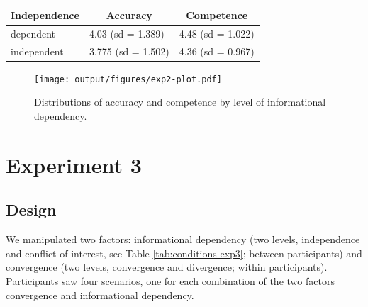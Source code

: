 \documentclass[
  doc,floatsintext]{apa6}
\begin{document}
\begin{table}[tbp]

\begin{center}
\begin{threeparttable}

\caption{\label{tab:exp2-table}}

\begin{tabular}{lll}
\toprule
Independence & \multicolumn{1}{c}{Accuracy} & \multicolumn{1}{c}{Competence}\\
\midrule
dependent & 4.03 (sd = 1.389) & 4.48 (sd = 1.022)\\
independent & 3.775 (sd = 1.502) & 4.36 (sd = 0.967)\\
\bottomrule
\end{tabular}

\end{threeparttable}
\end{center}

\end{table}



\begin{figure}
\centering
\texttt{[image: output/figures/exp2-plot.pdf]}
\caption{\label{fig:exp2-plot}Distributions of accuracy and competence by level of informational dependency.}
\end{figure}

\clearpage

\section{Experiment 3}\label{exp3}

\subsection{Design}\label{design-7}

\FloatBarrier

We manipulated two factors: informational dependency (two levels, independence and conflict of interest, see Table \ref{tab:conditions-exp3}; between participants) and convergence (two levels, convergence and divergence; within participants). Participants saw four scenarios, one for each combination of the two factors convergence and informational dependency.
\end{document}
